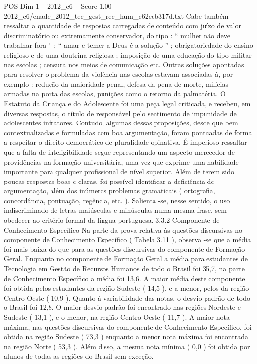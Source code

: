 \begin{textsample}{POS Dim 1 – 2012\_c6 – Score 1.00 – 2012\_c6/enade\_2012\_tec\_gest\_rec\_hum\_c62ecb317d.txt}
Cabe também ressaltar a quantidade de respostas carregadas de conteúdo com juízo de valor discriminatório ou extremamente conservador, do tipo : “ mulher não deve trabalhar fora ” ; “ amar e temer a Deus é a solução ” ; obrigatoriedade do ensino religioso e de uma doutrina religiosa ; imposição de uma educação do tipo militar nas escolas ; censura nos meios de comunicação etc.
Outras soluções apontadas para resolver o problema da violência nas escolas estavam associadas à, por exemplo : redução da maioridade penal, defesa da pena de morte, milícias armadas na porta das escolas, punições como o retorno da palmatória.
O Estatuto da Criança e do Adolescente foi uma peça legal criticada, e recebeu, em diversas respostas, o título de responsável pelo sentimento de impunidade de adolescentes infratores.
Contudo, algumas dessas proposições, desde que bem contextualizadas e formuladas com boa argumentação, foram pontuadas de forma a respeitar o direito democrático de pluralidade opinativa.
É imperioso ressaltar que a falta de inteligibilidade segue representando um aspecto merecedor de providências na formação universitária, uma vez que exprime uma habilidade importante para qualquer profissional de nível superior.
Além de terem sido poucas respostas boas e claras, foi possível identificar a deficiência de argumentação, além dos inúmeros problemas gramaticais ( ortografia, concordância, pontuação, regência, etc. ).
Salienta -se, nesse sentido, o uso indiscriminado de letras maiúsculas e minúsculas numa mesma frase, sem obedecer ao critério formal da língua portuguesa. 3.3.2 Componente de Conhecimento Específico Na parte da prova relativa às questões discursivas no componente de Conhecimento Específico ( Tabela 3.11 ), observa -se que a média foi mais baixa do que para as questões discursivas do componente de Formação Geral.
Enquanto no componente de Formação Geral a média para estudantes de Tecnologia em Gestão de Recursos Humanos de todo o Brasil foi 35,7, na parte de Conhecimento Específico a média foi 13,6.
A maior média deste componente foi obtida pelos estudantes da região Sudeste ( 14,5 ), e a menor, pelos da região Centro-Oeste ( 10,9 ).
Quanto à variabilidade das notas, o desvio padrão de todo o Brasil foi 12,8.
O maior desvio padrão foi encontrado nas regiões Nordeste e Sudeste ( 13,1 ), e o menor, na região Centro-Oeste ( 11,7 ).
A maior nota máxima, nas questões discursivas do componente de Conhecimento Específico, foi obtida na região Sudeste ( 73,3 ) enquanto a menor nota máxima foi encontrada na região Norte ( 53,3 ).
Além disso, a mesma nota mínima ( 0,0 ) foi obtida por alunos de todas as regiões do Brasil sem exceção.

\end{textsample}
